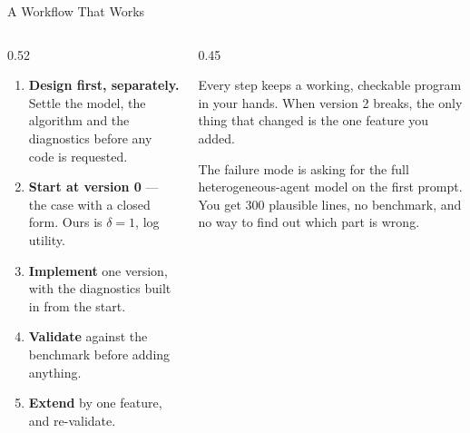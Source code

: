 \begin{frame}{A Workflow That Works}
\begin{columns}[T]
\begin{column}{0.52\textwidth}
\small
\begin{enumerate}\footnotesize
  \item \textbf{Design first, separately.} Settle the model, the algorithm and the diagnostics before any code is requested.
  \item \textbf{Start at version 0} --- the case with a closed form. Ours is $\delta=1$, log utility.
  \item \textbf{Implement} one version, with the diagnostics built in from the start.
  \item \textbf{Validate} against the benchmark before adding anything.
  \item \textbf{Extend} by one feature, and re-validate.
\end{enumerate}
\end{column}
\begin{column}{0.45\textwidth}
\begin{takeawaybox}[title=\textbf{Why this order}]\small
Every step keeps a working, checkable program in your hands. When version 2 breaks, the only thing that changed is the one feature you added.
\end{takeawaybox}
\medskip
\begin{cautionbox}\footnotesize
The failure mode is asking for the full heterogeneous-agent model on the first prompt. You get 300 plausible lines, no benchmark, and no way to find out which part is wrong.
\end{cautionbox}
\end{column}
\end{columns}
\vspace{1mm}
\end{frame}


